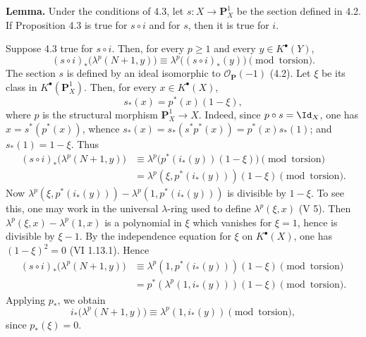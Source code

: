 \documentclass[11pt]{article}
\begin{document}
\textbf{Lemma.} Under the conditions of 4.3, let \(s:X\to\mathbf P_X^1\) be the section defined in 4.2. If Proposition 4.3 is true for \(s\circ i\) and for \(s\), then it is true for \(i\).

Suppose 4.3 true for \(s\circ i\). Then, for every \(p\ge1\) and every \(y\in K^\bullet(Y)\),
\begin{equation}\tag{4.3.3}
 (s\circ i)_*\bigl(\lambda^p(N+1,y)\bigr)
 \equiv
 \lambda^p\bigl((s\circ i)_*(y)\bigr)
 \pmod{\text{torsion}}.
\end{equation}
The section \(s\) is defined by an ideal isomorphic to \(\mathcal O_{\mathbf P}(-1)\) (4.2). Let \(\xi\) be its class in \(K^\bullet(\mathbf P_X^1)\). Then, for every \(x\in K^\bullet(X)\),
\[
  s_*(x)=p^*(x)(1-\xi),
\]
where \(p\) is the structural morphism \(\mathbf P_X^1\to X\). Indeed, since \(p\circ s=\Id_X\), one has \(x=s^*(p^*(x))\), whence \(s_*(x)=s_*(s^*p^*(x))=p^*(x)s_*(1)\); and \(s_*(1)=1-\xi\). Thus
\[
\begin{aligned}
(s\circ i)_*\bigl(\lambda^p(N+1,y)\bigr)
&\equiv \lambda^p\bigl(p^*(i_*(y))(1-\xi)\bigr)\pmod{\text{torsion}}\\
&= \lambda^p(\xi,p^*(i_*(y)))(1-\xi)\pmod{\text{torsion}}.
\end{aligned}
\]
Now \(\lambda^p(\xi,p^*(i_*(y)))-\lambda^p(1,p^*(i_*(y)))\) is divisible by \(1-\xi\). To see this, one may work in the universal \(\lambda\)-ring used to define \(\lambda^p(\xi,x)\) (V 5). Then \(\lambda^p(\xi,x)-\lambda^p(1,x)\) is a polynomial in \(\xi\) which vanishes for \(\xi=1\), hence is divisible by \(\xi-1\). By the independence equation for \(\xi\) on \(K^\bullet(X)\), one has \((1-\xi)^2=0\) (VI 1.13.1). Hence
\[
\begin{aligned}
(s\circ i)_*\bigl(\lambda^p(N+1,y)\bigr)
&\equiv \lambda^p(1,p^*(i_*(y)))(1-\xi) \pmod{\text{torsion}}\\
&=p^*(\lambda^p(1,i_*(y)))(1-\xi) \pmod{\text{torsion}}.
\end{aligned}
\]
Applying \(p_*\), we obtain
\begin{equation}\tag{4.3.4}
  i_*\bigl(\lambda^p(N+1,y)\bigr)
  \equiv \lambda^p(1,i_*(y)) \pmod{\text{torsion}},
\end{equation}
since \(p_*(\xi)=0\).
\end{document}
